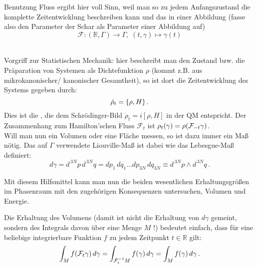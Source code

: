 \documentclass[../KlassMech_main.tex]{subfiles}
\begin{document}
Benutzung Fluss ergibt hier voll Sinn, weil man so zu jedem Anfangszustand die komplette Zeitentwicklung beschreiben kann und das in einer Abbildung (fasse also den Parameter der Schar als Parameter einer Abbildung auf)
\begin{equation}
\mathcal{F}: (\mathbb{R}, \Gamma) \rightarrow \Gamma, \; (t, \gamma) \mapsto \gamma(t)
\end{equation}

	\\

Vorgriff zur Statistischen Mechanik: hier beschreibt man den Zustand bzw. die Präparation von Systemen als Dichtefunktion $\rho$ (kommt z.B. aus mikrokanonischer/ kanonischer Gesamtheit), so ist dort die Zeitentwicklung des Systems gegeben durch:
\begin{equation}
\dot{\rho}_t = \qty{\rho, H} \, .
\end{equation}
Dies ist die , die dem Schrödinger-Bild $\dot{\rho}_t = i [\rho, H]$ in der QM entspricht. Der Zusammenhang zum Hamilton'schen Fluss $\mathcal{F}_t$ ist $\rho_t(\gamma) = \rho\qty(\mathcal{F}_{-t} \gamma)$.\\

Will man nun ein Volumen oder eine Fläche messen, so ist dazu immer ein Maß nötig. Das auf $\Gamma$ verwendete Liouville-Maß ist dabei wie das Lebesgue-Maß definiert:
\begin{equation}
d\gamma = d^{\,3N}p \, d^{\,3N}q = dp_1 \, dq_1 \dots dp_{3N} \, dq_{3N} \equiv d^{\,3N}p \wedge d^{\,3N}q \, .
\end{equation}

Mit diesem Hilfsmittel kann man nun die beiden wesentlichen Erhaltungsgrößen im Phasenraum mit den zugehörigen Konsequenzen untersuchen, Volumen und Energie.

Die Erhaltung des Volumens (damit ist nicht die Erhaltung von $d\gamma$ gemeint, sondern des Integrals davon über eine Menge $M$ !) bedeutet einfach, dass für eine beliebige integrierbare Funktion $f$ zu jedem Zeitpunkt $t \in \mathbb{R}$ gilt:
\begin{equation}\label{eq:zeitentw}
\int_M f\qty(\mathcal{F}_t \gamma) \, d\gamma = \int_{\mathcal{F}_t^{-1} M} f\qty(\gamma) \, d\gamma = \int_M f(\gamma) \, d\gamma \, .
\end{equation}
\end{document}
